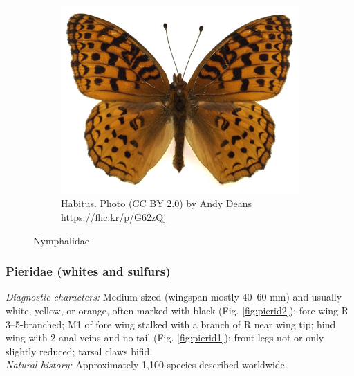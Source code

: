 \documentclass[letterpaper, 11pt]{article}
\begin{document}
\begin{figure}[ht!]
\begin{subfigure}[ht!]{0.5\textwidth}
        \includegraphics[width=\textwidth]{NymphalidHabitus}
        \caption{Habitus. Photo (CC BY 2.0) by Andy Deans \url{https://flic.kr/p/G62zQj}}
        \label{fig:nymphalid2}
    \end{subfigure}
    \caption{Nymphalidae}\label{fig:nymphalids}
\end{figure}

\subsubsection{Pieridae (whites and sulfurs)}
\noindent{}\textit{Diagnostic characters:} Medium sized (wingspan mostly 40--60 mm) and usually white, yellow, or orange, often marked with black (Fig. \ref{fig:pierid2}); fore wing R 3--5-branched; M1 of fore wing stalked with a branch of R near wing tip; hind wing with 2 anal veins and no tail (Fig. \ref{fig:pierid1}); front legs not or only slightly reduced; tarsal claws bifid.\\

\noindent{}\textit{Natural history:} Approximately 1,100 species described worldwide.
\end{document}

